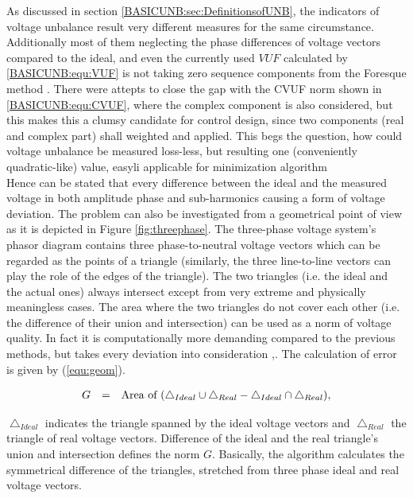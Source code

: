     As discussed in section \ref{BASICUNB:sec:DefinitionsofUNB}, the indicators of voltage unbalance result very different measures for the same circumstance. Additionally most of them neglecting the phase differences of voltage vectors compared to the ideal, and even the currently used $VUF$ calculated by \ref{BASICUNB:equ:VUF} is not taking zero sequence components from the Foresque method \cite{fortescue1918method}. There were attepts to close the gap with the CVUF norm shown in \ref{BASICUNB:equ:CVUF}, where the complex component is also considered, but this makes this a clumsy candidate for control design, since two components (real and complex part) shall weighted and applied. This begs the question, how could voltage unbalance be measured loss-less, but resulting one (conveniently quadratic-like) value, easyli applicable for minimization algorithm \\
		Hence can be stated that every difference between the ideal and the measured voltage in both amplitude phase and sub-harmonics causing a form of voltage deviation. The problem can also be investigated from a geometrical point of view as it is depicted in Figure \ref{fig:threephase}. The three-phase voltage system's phasor diagram contains three  phase-to-neutral voltage vectors which can be regarded as the points of a triangle (similarly, the three line-to-line vectors can play the role of the edges of the triangle). The two triangles (i.e. the ideal and the actual ones) always intersect except from very extreme and physically meaningless cases. The area where the two triangles do not cover each other (i.e. the difference of their union and intersection) can be used as a norm of voltage quality. In fact it is computationally more demanding compared to the previous methods, but takes every deviation into consideration \cite{Neukirchner2015},\cite{neukirchner2015examination}. The calculation of error is given by (\ref{equ:geom}).

            \begin{equation}
                \begin{array}{rcl}
                       G&=&\textnormal{Area of }(\bigtriangleup_{Ideal}\cup\bigtriangleup_{Real}-\bigtriangleup_{Ideal}\cap\bigtriangleup_{Real}),
                \end{array}
                \label{equ:geom}
            \end{equation}

            $\bigtriangleup_{Ideal}$ indicates the triangle spanned by the ideal voltage vectors and $\bigtriangleup_{Real}$ the triangle of real voltage vectors. Difference of the ideal and the real triangle's union and intersection defines the norm $G$. Basically, the algorithm calculates the symmetrical difference of the triangles, stretched from three phase ideal and real voltage vectors.

